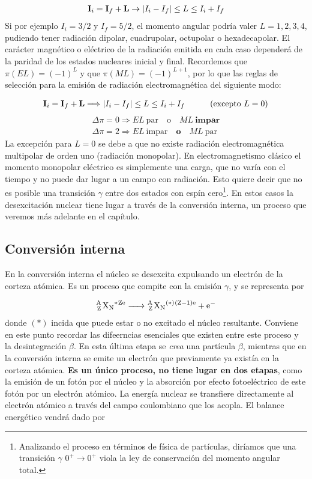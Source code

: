 \begin{eqnarray}
	\mathbf{I}_i = \mathbf{I}_f + \mathbf{L}  \rightarrow |I_i -I_f|\leq L\leq I_i + I_f
\end{eqnarray}
Si por ejemplo $I_i=3/2$ y $I_f=5/2$, el momento angular podría valer $L=1,2,3,4$, pudiendo tener radiación dipolar, cuadrupolar, octupolar o hexadecapolar. El carácter magnético o eléctrico de la radiación emitida en cada caso dependerá de la paridad de los estados nucleares inicial y final. Recordemos que $\pi(EL)=(-1)^L$ y que $\pi(ML)=(-1)^{L+1}$, por lo que las reglas de selección para la emisión de radiación electromagnética del siguiente modo:

\begin{eqnarray}
	\mathbf{I}_i = \mathbf{I}_f + \mathbf{L} \Longrightarrow |I_i -I_f|\leq L\leq I_i + I_f \quad \quad \quad (\text{excepto} \ L=0)
\end{eqnarray}
\begin{eqnarray*}
 	\Delta \pi = 0 \Longrightarrow EL \ \text{par} \quad \text{o} \quad M L  \ \textbf{impar} \\ 	
 	\Delta \pi = 2 \Longrightarrow EL \ \text{impar} \quad \textbf{o} \quad ML \ \text{par}
\end{eqnarray*} 
La excepción para $L=0$ se debe a que no existe radiación electromagnética multipolar de orden uno (radiación monopolar). En electromagnetismo clásico el momento monopolar eléctrico es simplemente una carga, que no varía con el tiempo y no puede dar lugar a un campo con radiación. Esto quiere decir que no es posible una transición $\gamma$ entre dos estados con espín cero\footnote{Analizando el proceso en términos de física de partículas, diríamos que una transición $\gamma$ $0^+ \rightarrow 0^+$ viola la ley de conservación del momento angular total.}. En estos casos la desexcitación nuclear tiene lugar a través de la conversión interna, un proceso que veremos más adelante en el capítulo.

\subsection{Conversión interna}

En la conversión interna el núcleo se desexcita expulsando un electrón de la corteza atómica. Es un proceso que compite con la emisión $\gamma$, y se representa por

\begin{eqnarray}
	\ce{^A_Z X_N^*^{Ze} -> ^A_Z X_N^{(*)}^{(Z-1)e} + e^-}
\end{eqnarray}
donde $(*)$ incida que puede estar o no excitado el núcleo resultante. Conviene en este punto recordar las difeerncias esenciales que existen entre este proceso y la desintegración $\beta$. En esta última etapa se \textit{crea} una partícula $\beta$, mientras que en la conversión interna se emite un electrón que previamente ya existía en la corteza atómica. \textbf{Es un único proceso, no tiene lugar en dos etapas}, como la emisión de un fotón por el núcleo y la absorción por efecto fotoeléctrico de este fotón por un electrón atómico. La energía nuclear se transfiere directamente al electrón atómico a través del campo coulombiano que los acopla. El balance energético vendrá dado por 

